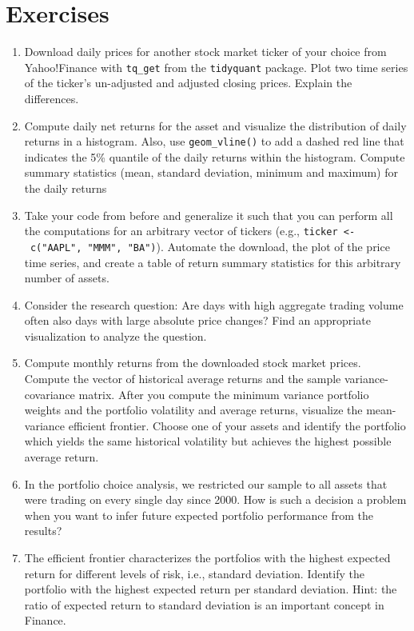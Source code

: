 \documentclass[
]{book}
\providecommand{\tightlist}{%
  \setlength{\itemsep}{0pt}\setlength{\parskip}{0pt}}
\begin{document}
\hypertarget{exercises}{%
\section{Exercises}\label{exercises}}

\begin{enumerate}
\def\labelenumi{\arabic{enumi}.}
\tightlist
\item
  Download daily prices for another stock market ticker of your choice from Yahoo!Finance with \texttt{tq\_get} from the \texttt{tidyquant} package. Plot two time series of the ticker's un-adjusted and adjusted closing prices. Explain the differences.
\item
  Compute daily net returns for the asset and visualize the distribution of daily returns in a histogram. Also, use \texttt{geom\_vline()} to add a dashed red line that indicates the 5\% quantile of the daily returns within the histogram. Compute summary statistics (mean, standard deviation, minimum and maximum) for the daily returns
\item
  Take your code from before and generalize it such that you can perform all the computations for an arbitrary vector of tickers (e.g., \texttt{ticker\ \textless{}-\ c("AAPL",\ "MMM",\ "BA")}). Automate the download, the plot of the price time series, and create a table of return summary statistics for this arbitrary number of assets.
\item
  Consider the research question: Are days with high aggregate trading volume often also days with large absolute price changes? Find an appropriate visualization to analyze the question.
\item
  Compute monthly returns from the downloaded stock market prices. Compute the vector of historical average returns and the sample variance-covariance matrix. After you compute the minimum variance portfolio weights and the portfolio volatility and average returns, visualize the mean-variance efficient frontier. Choose one of your assets and identify the portfolio which yields the same historical volatility but achieves the highest possible average return.
\item
  In the portfolio choice analysis, we restricted our sample to all assets that were trading on every single day since 2000. How is such a decision a problem when you want to infer future expected portfolio performance from the results?
\item
  The efficient frontier characterizes the portfolios with the highest expected return for different levels of risk, i.e., standard deviation. Identify the portfolio with the highest expected return per standard deviation. Hint: the ratio of expected return to standard deviation is an important concept in Finance.
\end{enumerate}
\end{document}
